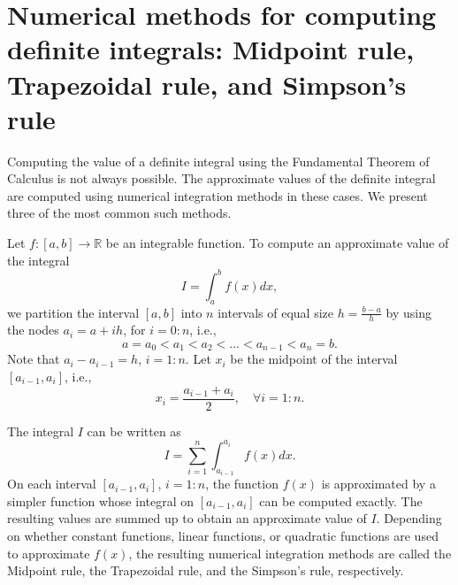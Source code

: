 \section{Numerical methods for computing definite integrals: Midpoint rule,
    Trapezoidal rule, and Simpson's rule}
Computing the value of a definite integral using the Fundamental Theorem of
    Calculus is not always possible.
The approximate values of the definite integral are computed using numerical
    integration methods in these cases.
We present three of the most common such methods.

Let $ f : [a, b] \rightarrow \mathbb{R} $ be an integrable function.
To compute an approximate value of the integral
\begin{equation*}
    I = \int_{a}^{b} f(x) dx,
\end{equation*}
we partition the interval $ [a, b] $ into $ n $ intervals of equal size
    $ h = \frac{b - a}{h} $ by using the nodes $ a_i = a + i h $, for
    $ i = 0 : n $, i.e.,
\begin{equation*}
    a = a_0 < a_1 < a_2 < ... < a_{n - 1} < a_n = b.
\end{equation*}
Note that $ a_i - a_{i - 1} = h $, $ i = 1 : n $.
Let $ x_i $ be the midpoint of the interval $ [a_{i - 1}, a_i] $, i.e.,
\begin{equation*}
    x_i = \frac{a_{i - 1} + a_i}{2}, \quad \forall i = 1 : n.
\end{equation*}

The integral $ I $ can be written as
\begin{equation}
    I = \sum_{i=1}^{n} \int_{a_{i-1}}^{a_i} f(x) dx.
    \label{eq:integral-interval}
\end{equation}
On each interval $ [a_{i-1}, a_i] $, $ i = 1 : n $, the function $ f(x) $ is
    approximated by a simpler function whose integral on $ [a_{i-1}, a_i] $ can
    be computed exactly.
The resulting values are summed up to obtain an approximate value of $ I $.
Depending on whether constant functions, linear functions, or quadratic
    functions are used to approximate $ f(x) $, the resulting numerical
    integration methods are called the Midpoint rule, the Trapezoidal rule, and
    the Simpson's rule, respectively.


